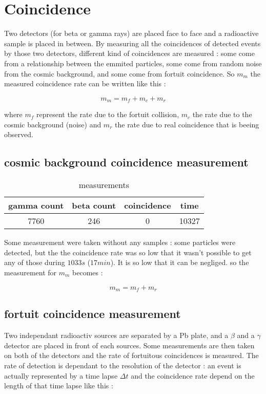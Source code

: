 \documentclass[a4paper,12pt,oneside]{article}
\def \be {\begin{equation}}
\def \ee {\end{equation}}
\begin{document}
\newpage
\section{Coincidence}

Two detectors (for beta or gamma rays) are placed face to face and a radioactive sample is placed in between. By measuring all the coincidences of detected events by those two detectors, different kind of coincidences are measured : some come from a relationship between the emmited particles, some come from random noise from the cosmic background, and some come from fortuit coincidence. So $m_m$ the measured coincidence rate can be written like this :

\be 
	m_m = m_f + m_c + m_r
\ee 

where $m_f$ represent the rate due to the fortuit collision, $m_c$ the rate due to the cosmic background (noise) and $m_r$ the rate due to real coincidence that is beeing observed. 

\subsection{cosmic background coincidence measurement}


\begin{table}[h!]
\centering
	\begin{tabular}{|c|c|c|c|}
		\hline
			gamma count		&beta count		&coincidence	&time\\
		\hline
			7760			&246			&0				&10327\\
		\hline
	\end{tabular}
	\caption{measurements}
	\label{tab:poisson}
\end{table}


Some measurement were taken without any samples : some particles were detected, but the the coincidence rate was so low that it wasn't possible to get any of those during $1033 s$ ($17 min$). It is so low that it can be negliged. so the measurement for $m_m$ becomes :

\be 
	m_m = m_f + m_r
\ee 

\subsection{fortuit coincidence measurement}

Two independant radioactiv sources are separated by a Pb plate, and a $\beta$ and a $\gamma$ detector are placed in front of each sources. Some measurements are then taken on both of the detectors and the rate of fortuitous coincidences is measured. The rate of detection is dependant to the resolution of the detector : an event is actually represented by a time lapse $\Delta t$ and the coincidence rate depend on the length of that time lapse like this :
\end{document}
